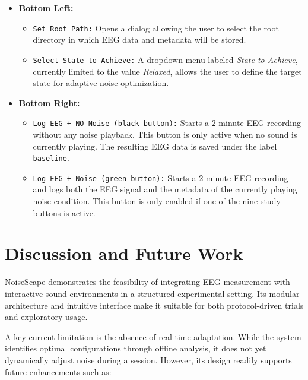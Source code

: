 \begin{enumerate}
\begin{itemize}
\item \textbf{Bottom Left:}
  \begin{itemize}
    \item \texttt{Set Root Path:} Opens a dialog allowing the user to select the root directory in which EEG data and metadata will be stored.
    \item \texttt{Select State to Achieve:} A dropdown menu labeled \textit{State to Achieve}, currently limited to the value \textit{Relaxed}, allows the user to define the target state for adaptive noise optimization.
  \end{itemize}

\item \textbf{Bottom Right:}
  \begin{itemize}
    \item \texttt{Log EEG + NO Noise (black button):} Starts a 2-minute EEG recording without any noise playback. This button is only active when no sound is currently playing. The resulting EEG data is saved under the label \texttt{baseline}.
    \item \texttt{Log EEG + Noise (green button):} Starts a 2-minute EEG recording and logs both the EEG signal and the metadata of the currently playing noise condition. This button is only enabled if one of the nine study buttons is active.
  \end{itemize}
\end{itemize}

\end{enumerate}






\section{Discussion and Future Work}

NoiseScape demonstrates the feasibility of integrating EEG measurement with interactive sound environments in a structured experimental setting. Its modular architecture and intuitive interface make it suitable for both protocol-driven trials and exploratory usage.

A key current limitation is the absence of real-time adaptation. While the system identifies optimal configurations through offline analysis, it does not yet dynamically adjust noise during a session. However, its design readily supports future enhancements such as:


